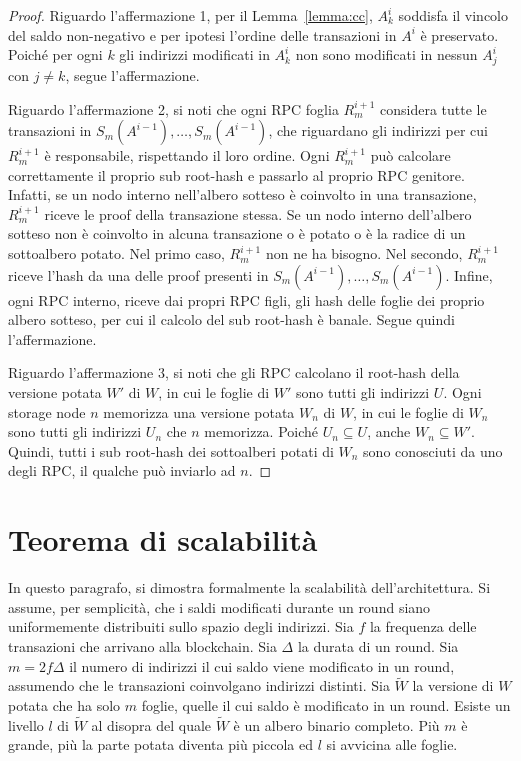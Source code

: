 \begin{proof}
Riguardo l'affermazione 1, per il Lemma~\ref{lemma:cc}, $A_k^i$ soddisfa il vincolo del saldo non-negativo e per ipotesi l'ordine delle transazioni in $A^i$ è preservato. Poiché per ogni $k$ gli indirizzi modificati in $A_k^i$ non sono modificati in nessun $A_j^i$ con $j \neq k$, segue l'affermazione.

Riguardo l'affermazione 2, si noti che ogni RPC foglia $R_m^{i+1}$ considera tutte le transazioni in $S_m(A^{i-1}), \dots, S_m(A^{i-1})$, che riguardano gli indirizzi per cui $R_m^{i+1}$ è responsabile, rispettando il loro ordine. Ogni $R_m^{i+1}$ può calcolare correttamente il proprio sub root-hash e passarlo al proprio RPC genitore. Infatti, se un nodo interno nell'albero sotteso è coinvolto in una transazione, $R_m^{i+1}$ riceve le proof della transazione stessa. Se un nodo interno dell'albero sotteso non è coinvolto in alcuna transazione o è potato o è la radice di un sottoalbero potato. Nel primo caso, $R_m^{i+1}$ non ne ha bisogno. Nel secondo, $R_m^{i+1}$ riceve l'hash da una delle proof presenti in $S_m(A^{i-1}), \dots, S_m(A^{i-1})$. Infine, ogni RPC interno, riceve dai propri RPC figli, gli hash delle foglie dei proprio albero sotteso, per cui il calcolo del sub root-hash è banale. Segue quindi l'affermazione.

Riguardo l'affermazione 3, si noti che gli RPC calcolano il root-hash della versione potata $W'$ di $W$, in cui le foglie di $W'$ sono tutti gli indirizzi $U$. Ogni storage node $n$ memorizza una versione potata $W_n$ di $W$, in cui le foglie di $W_n$ sono tutti gli indirizzi $U_n$ che $n$ memorizza. Poiché $U_n \subseteq U$, anche $W_n \subseteq W'$. Quindi, tutti i sub root-hash dei sottoalberi potati di $W_n$ sono conosciuti da uno degli RPC, il qualche può inviarlo ad $n$.
\end{proof}


\section{Teorema di scalabilità}

In questo paragrafo, si dimostra formalmente la scalabilità dell'architettura. Si assume, per semplicità, che i saldi modificati durante un round siano uniformemente distribuiti sullo spazio degli indirizzi.
Sia $f$ la frequenza delle transazioni che arrivano alla blockchain. Sia $\Delta$ la durata di un round. Sia $m = 2 f \Delta$ il numero di indirizzi il cui saldo viene modificato in un round, assumendo che le transazioni coinvolgano indirizzi distinti. Sia $\widetilde{W}$ la versione di $W$ potata che ha solo $m$ foglie, quelle il cui saldo è modificato in un round. Esiste un livello $l$ di $\widetilde{W}$ al disopra del quale $\widetilde{W}$ è un albero binario completo. Più $m$ è grande, più la parte potata diventa più piccola ed $l$ si avvicina alle foglie.

